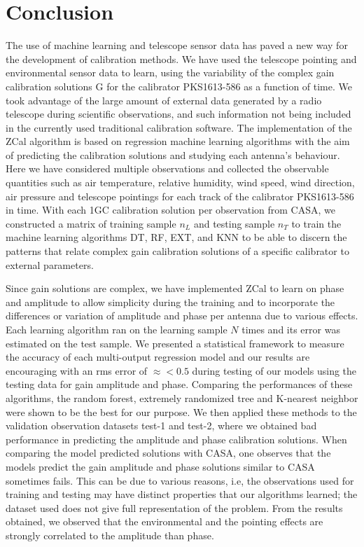 \chapter{Conclusion}

The use of machine learning and telescope sensor data has paved a new way for the development of calibration methods. We have used the telescope pointing and environmental sensor data to learn, using the variability of the complex gain calibration solutions G for the calibrator PKS1613-586 as a function of time. We took advantage of the large amount of external data generated by a radio telescope during scientific observations, and such information not being included in the currently used traditional calibration software. The implementation of the ZCal algorithm is based on regression machine learning algorithms with the aim of predicting the calibration solutions and studying each antenna's behaviour. Here we have considered multiple observations and collected the observable quantities such as air temperature, relative humidity, wind speed, wind direction, air pressure and telescope pointings for each track of the calibrator PKS1613-586 in time. With each 1GC calibration solution per observation from CASA, we constructed a matrix of training sample $n_L$ and testing sample $n_T$ to train the machine learning algorithms DT, RF, EXT, and KNN to be able to discern the patterns that relate complex gain  calibration solutions of a specific calibrator to external parameters.       

Since gain solutions are complex, we have implemented  ZCal to learn on phase and amplitude to allow simplicity during the training and to incorporate the differences or variation of amplitude and phase per antenna due to various effects. Each learning algorithm ran on the learning sample $N$ times and its error was estimated on the test sample. We presented a statistical framework to measure the accuracy of each multi-output regression model and our results are encouraging with an rms error of $\approx < 0.5$ during testing of our models using the testing data for gain amplitude and phase. Comparing the performances of these algorithms, the random forest, extremely randomized tree and K-nearest neighbor were shown to be the best for our purpose. We then applied these methods to the validation observation datasets test-1 and test-2, where we obtained bad performance in predicting the amplitude and phase calibration solutions. When comparing the model predicted solutions with CASA, one observes that the models predict the gain amplitude and phase solutions similar to CASA sometimes fails. This can be due to various reasons, i.e, the observations used for training and testing may have distinct properties that our algorithms learned; the dataset used does not give full representation of the problem. From the results obtained, we observed that the environmental and the pointing effects are strongly correlated to the amplitude than phase. 

